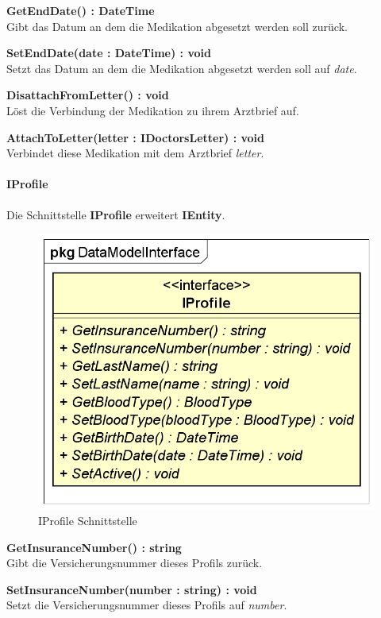 \documentclass[a4paper]{scrreprt}
\begin{document}
\textbf{GetEndDate() : DateTime}\\
Gibt das Datum an dem die Medikation abgesetzt werden soll zurück.

\textbf{SetEndDate(date : DateTime) : void}\\
Setzt das Datum an dem die Medikation abgesetzt werden soll auf \textit{date}.

\textbf{DisattachFromLetter() : void}\\
Löst die Verbindung der Medikation zu ihrem Arztbrief auf.

\textbf{AttachToLetter(letter : IDoctorsLetter) : void}\\
Verbindet diese Medikation mit dem Arztbrief \textit{letter}.


\paragraph{IProfile}
Die Schnittstelle \textbf{IProfile} erweitert \textbf{IEntity}.

\begin{figure}[H]
\centering
\includegraphics[width=0.55\textheight]{graphics/Klassendiagramme/Model/IProfile.png}
\caption{IProfile Schnittstelle}
\end{figure}
\textbf{GetInsuranceNumber() : string}\\
Gibt die Versicherungsnummer dieses Profils zurück.

\textbf{SetInsuranceNumber(number : string) : void}\\
Setzt die Versicherungsnummer dieses Profils auf \textit{number}.
\end{document}

